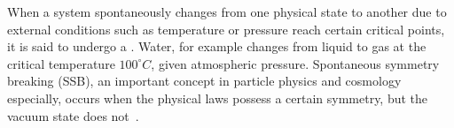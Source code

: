 


















 








When a system spontaneously changes from one physical state to another due to external conditions such as temperature or pressure reach certain critical points, it is said to undergo a . Water, for example changes from liquid to gas at the critical temperature $100^\circ\unit{C}$, given atmospheric pressure. Spontaneous symmetry breaking (SSB), an important concept in particle physics and cosmology especially, occurs when the physical laws possess a certain symmetry, but the vacuum state does not~\citep{kolbEarlyUniverse1990}.

